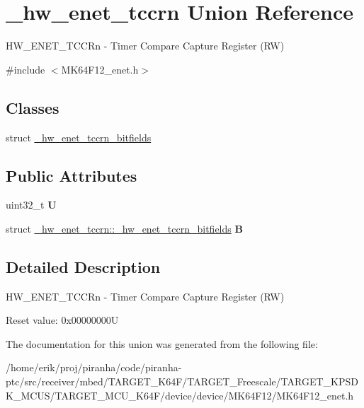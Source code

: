 \hypertarget{union__hw__enet__tccrn}{}\section{\+\_\+hw\+\_\+enet\+\_\+tccrn Union Reference}
\label{union__hw__enet__tccrn}


H\+W\+\_\+\+E\+N\+E\+T\+\_\+\+T\+C\+C\+Rn -\/ Timer Compare Capture Register (RW)  




{\ttfamily \#include $<$M\+K64\+F12\+\_\+enet.\+h$>$}

\subsection*{Classes}
\begin{DoxyCompactItemize}
\item 
struct \hyperlink{struct__hw__enet__tccrn_1_1__hw__enet__tccrn__bitfields}{\+\_\+hw\+\_\+enet\+\_\+tccrn\+\_\+bitfields}
\end{DoxyCompactItemize}
\subsection*{Public Attributes}
\begin{DoxyCompactItemize}
\item 
uint32\+\_\+t {\bfseries U}\hypertarget{union__hw__enet__tccrn_a711de2c533c9f257846c72d48e8b224d}{}\label{union__hw__enet__tccrn_a711de2c533c9f257846c72d48e8b224d}

\item 
struct \hyperlink{struct__hw__enet__tccrn_1_1__hw__enet__tccrn__bitfields}{\+\_\+hw\+\_\+enet\+\_\+tccrn\+::\+\_\+hw\+\_\+enet\+\_\+tccrn\+\_\+bitfields} {\bfseries B}\hypertarget{union__hw__enet__tccrn_a3a717dca8cdc89647873ac7ea97ca54c}{}\label{union__hw__enet__tccrn_a3a717dca8cdc89647873ac7ea97ca54c}

\end{DoxyCompactItemize}


\subsection{Detailed Description}
H\+W\+\_\+\+E\+N\+E\+T\+\_\+\+T\+C\+C\+Rn -\/ Timer Compare Capture Register (RW) 

Reset value\+: 0x00000000U 

The documentation for this union was generated from the following file\+:\begin{DoxyCompactItemize}
\item 
/home/erik/proj/piranha/code/piranha-\/ptc/src/receiver/mbed/\+T\+A\+R\+G\+E\+T\+\_\+\+K64\+F/\+T\+A\+R\+G\+E\+T\+\_\+\+Freescale/\+T\+A\+R\+G\+E\+T\+\_\+\+K\+P\+S\+D\+K\+\_\+\+M\+C\+U\+S/\+T\+A\+R\+G\+E\+T\+\_\+\+M\+C\+U\+\_\+\+K64\+F/device/device/\+M\+K64\+F12/M\+K64\+F12\+\_\+enet.\+h\end{DoxyCompactItemize}
